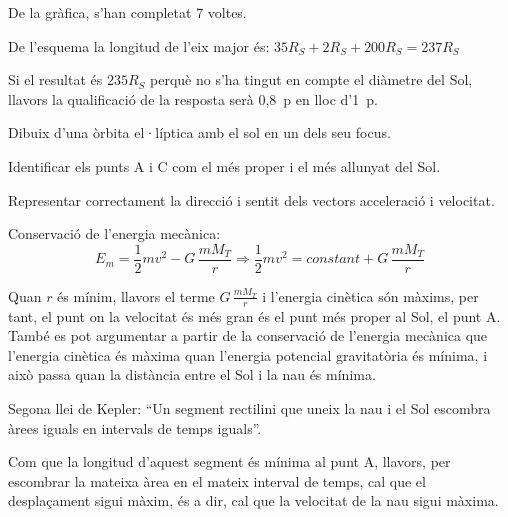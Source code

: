 \begin{solapartat}
 De la gràfica, s'han completat 7 voltes.

 De l'esquema la longitud de l'eix major és: $35R_S + 2R_S + 200R_S = 237R_S$

Si el resultat és $235R_S$ perquè no s'ha tingut en compte el diàmetre del Sol, llavors la qualificació de la resposta serà 0,8~p en lloc d'1~p.
\end{solapartat}

\begin{solapartat}
 Dibuix d'una òrbita el·líptica amb el sol en un dels seu focus.

 Identificar els punts A i C com el més proper i el més allunyat del Sol.

 Representar correctament la direcció i sentit dels vectors acceleració i velocitat.

\medskip
{} Conservació de l'energia mecànica:
\[ E_m = \frac{1}{2}mv^2 - G\,\frac{mM_T}{r} \Longrightarrow \frac{1}{2}mv^2 = \mathit{constant} + G\,\frac{mM_T}{r} \]

 Quan $r$ és mínim, llavors el terme $G\,\frac{mM_T}{r}$ i l'energia cinètica són màxims, per tant, el punt on la velocitat és més gran és el punt més proper al Sol, el punt A. També es pot argumentar a partir de la conservació de l'energia mecànica que l'energia cinètica és màxima quan l'energia potencial gravitatòria és mínima, i això passa quan la distància entre el Sol i la nau és mínima.

\medskip
{}

 Segona llei de Kepler: ``Un segment rectilini que uneix la nau i el Sol escombra àrees iguals en intervals de temps iguals''.

 Com que la longitud d'aquest segment és mínima al punt A, llavors, per escombrar la mateixa àrea en el mateix interval de temps, cal que el desplaçament sigui màxim, és a dir, cal que la velocitat de la nau sigui màxima.
\end{solapartat}
